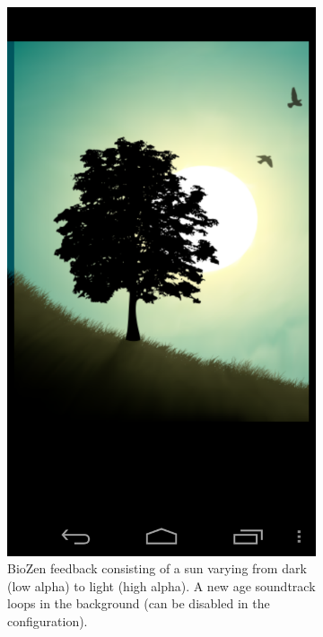 \documentclass[a4paper,10pt,english,lof,lot,twoside]{puthesis}
\begin{document}
\begin{figure}
\centering
\capstart
\begin{subfigure}[t]{0.30\linewidth}
\centering
\capstart

\includegraphics[width=0.800\linewidth]{biozen_feedback.png}
\caption[BioZen feedback]{BioZen feedback consisting of a sun varying from dark (low alpha) to light (high alpha).
A new age soundtrack loops in the background (can be
disabled in the configuration).}\label{ch-background/index:fig-background-biozen-feedback}\end{subfigure}
\begin{subfigure}[t]{0.30\linewidth}
\centering
\capstart


\end{subfigure}
\end{figure}
\end{document}
